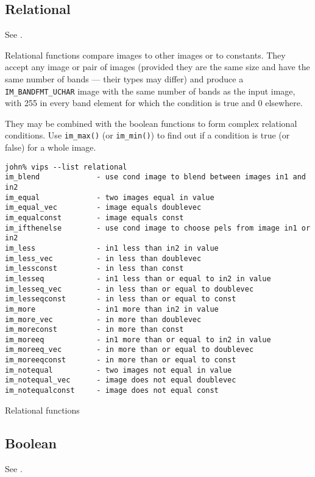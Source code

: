 \subsection{Relational}

See .

Relational functions compare images to other images or to constants. They
accept any image or pair of images (provided they are the same size and
have the same number of bands --- their types may differ) and produce a
\verb+IM_BANDFMT_UCHAR+ image with the same number of bands as the input
image, with 255 in every band element for which the condition is true and
0 elsewhere.

They may be combined with the boolean functions to form complex relational
conditions. Use \verb+im_max()+ (or \verb+im_min()+) to find out if a
condition is true (or false) for a whole image.

\begin{fig2}
\begin{verbatim}
john% vips --list relational
im_blend             - use cond image to blend between images in1 and in2
im_equal             - two images equal in value
im_equal_vec         - image equals doublevec
im_equalconst        - image equals const
im_ifthenelse        - use cond image to choose pels from image in1 or in2
im_less              - in1 less than in2 in value
im_less_vec          - in less than doublevec
im_lessconst         - in less than const
im_lesseq            - in1 less than or equal to in2 in value
im_lesseq_vec        - in less than or equal to doublevec
im_lesseqconst       - in less than or equal to const
im_more              - in1 more than in2 in value
im_more_vec          - in more than doublevec
im_moreconst         - in more than const
im_moreeq            - in1 more than or equal to in2 in value
im_moreeq_vec        - in more than or equal to doublevec
im_moreeqconst       - in more than or equal to const
im_notequal          - two images not equal in value
im_notequal_vec      - image does not equal doublevec
im_notequalconst     - image does not equal const
\end{verbatim}
\caption{Relational functions}
\label{fg:relational}
\end{fig2}

\subsection{Boolean}

See .

